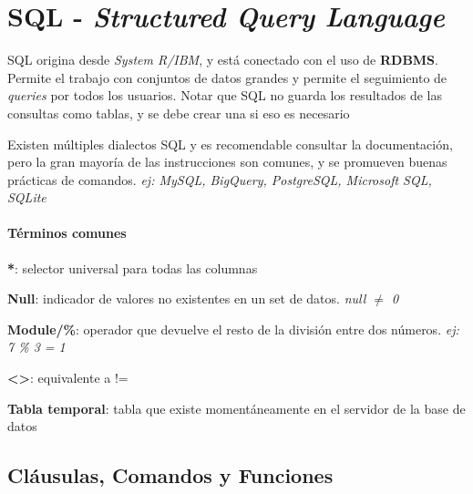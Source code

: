 
\section{SQL - \textit{Structured Query Language}}
SQL origina desde \textit{System R/IBM}, y está conectado con el uso de \textbf{RDBMS}. Permite el trabajo con conjuntos de datos grandes y permite el seguimiento de \textit{queries} por todos los usuarios. Notar que SQL no guarda los resultados de las consultas como tablas, y se debe crear una si eso es necesario

Existen múltiples dialectos SQL y es recomendable consultar la documentación, pero la gran mayoría de las instrucciones son comunes, y se promueven buenas prácticas de comandos. \textit{ej: MySQL, BigQuery, PostgreSQL, Microsoft SQL, SQLite}

\paragraph{Términos comunes}
\begin{description}
    \item {\textbf{*}: selector universal para todas las columnas}
    \item {\textbf{Null}: indicador de valores no existentes en un set de datos. \textit{null ${\neq}$ 0}} 
    \item {\textbf{Module/\%}: operador que devuelve el resto de la división entre dos números. \textit{ej: 7 \% 3 = 1}}
    \item {\textbf{<>}: equivalente a !=}
    \item {\textbf{Tabla temporal}: tabla que existe momentáneamente en el servidor de la base de datos}
    
\end{description}

\subsection{Cláusulas, Comandos y Funciones}
